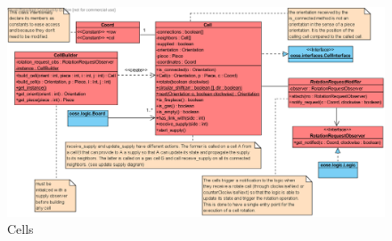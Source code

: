 \documentclass[a4paper,11pt]{article}
\begin{document}
\begin{figure}
	\center
	\includegraphics[angle=90,scale=1]{cells.png}
	\caption{Cells}
	\label{fig:cells}
\end{figure}
\end{document}
